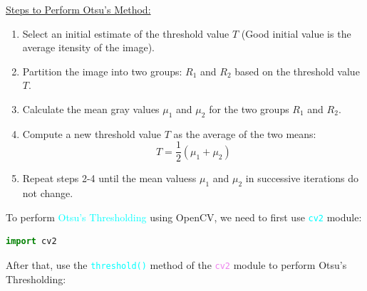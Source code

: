 \documentclass{book}
\begin{document}
\uline{Steps to Perform Otsu's Method:}\\
\vspace{1mm}
\begin{enumerate}
    \item Select an initial estimate of the threshold value $T$ (Good initial value is the average itensity of the image).
    \item Partition the image into two groups: $R_1$ and $R_2$ based on the threshold value $T$.
    \item Calculate the mean gray values $\mu_1$ and $\mu_2$ for the two groups $R_1$ and $R_2$.
    \item Compute a new threshold value $T$ as the average of the two means:
    \[
        T = \frac{1}{2}{(\mu_1+\mu_2)}
    \]
    \item Repeat steps 2-4 until the mean valuess $\mu_1$ and $\mu_2$ in successive iterations do not change.
\end{enumerate}
\vspace{5mm}
To perform \textcolor{cyan}{Otsu's Thresholding} using OpenCV, we need to first use \textcolor{cyan}{\texttt{cv2}} module:
\begin{lstlisting}[language=Python, basicstyle=\ttfamily\small, keywordstyle=\color{blue}, commentstyle=\color{forestgreen}, stringstyle=\color{red}, showstringspaces=false]
                                            import cv2
\end{lstlisting}
After that, use the \textcolor{cyan}{\texttt{threshold()}} method of the \textcolor{violet}{\texttt{cv2}} module to perform Otsu's Thresholding:
\newpage
\end{document}
